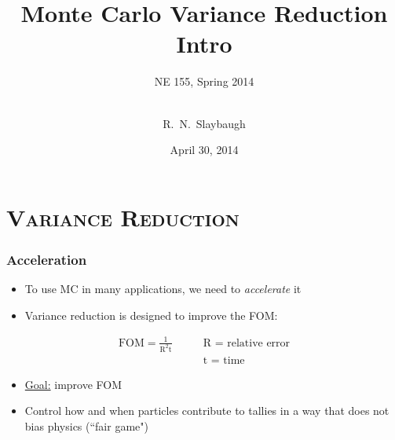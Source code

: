 \documentclass[xcolor=x11names,compress]{beamer}
\renewcommand{\(}{\begin{columns}}
\renewcommand{\)}{\end{columns}}
\newcommand{\<}[1]{\begin{column}{#1}}
\renewcommand{\>}{\end{column}}
\begin{document}
\begin{frame}
\title{Monte Carlo Variance Reduction Intro}
\subtitle{NE 155, Spring 2014}
\author{
        \\R.\ N.\ Slaybaugh}

\date{April 30, 2014}
\titlepage
\end{frame}


\section{\scshape Variance Reduction}
\begin{frame}[fragile]
  \frametitle{Acceleration}
  \begin{itemize}
  	\item To use MC in many applications, we need to \textit{accelerate} it
	\item Variance reduction is designed to improve the FOM:
  \end{itemize}
  \begin{align}
  \text{FOM} = \frac{1}{\text{R}^2\text{t}} \qquad & \text{R = relative error} \nonumber \\ 
  & \text{t = time} \nonumber 
  \end{align}
  \begin{itemize}
  	\item \underline{Goal:} improve FOM
  	\item Control how and when particles contribute to tallies in a way that does not bias physics (``fair game") 
  \end{itemize}

\end{frame}
\end{document}

